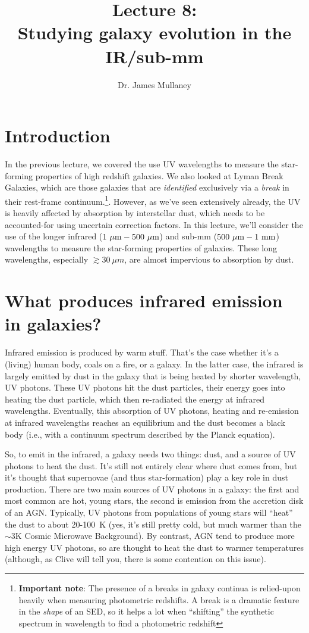 \documentclass[11pt]{article}
\begin{document}
 
\title{Lecture 8:\\Studying galaxy evolution in the IR/sub-mm}
\author{Dr. James Mullaney}
\maketitle

\section{Introduction}
In the previous lecture, we covered the use UV wavelengths to measure
the star-forming properties of high redshift galaxies. We also looked
at Lyman Break Galaxies, which are those galaxies that are {\it
  identified} exclusively via a {\it break} in their rest-frame
continuum.\footnote{{\bf Important note}: The presence of a breaks in
  galaxy continua is relied-upon heavily when measuring photometric
  redshifts. A break is a dramatic feature in the {\it shape} of an
  SED, so it helps a lot when ``shifting'' the synthetic spectrum in
  wavelength to find a photometric redshift}. However, as we've
seen extensively already, the UV is heavily affected by absorption
by interstellar dust, which needs to be accounted-for using uncertain
correction factors. In this lecture, we'll consider the use of the
longer infrared (${\rm 1~\rm \mu m - 500~\mu m}$) and sub-mm
(${\rm 500~\rm \mu m - 1~mm}$) wavelengths to measure the star-forming
properties of galaxies. These long wavelengths, especially
$\gtrsim30~\mu m$, are almost impervious to absorption by dust.

\section{What produces infrared emission in galaxies?}
Infrared emission is produced by warm stuff. That's the case whether
it's a (living) human body, coals on a fire, or a galaxy. In the
latter case, the infrared is largely emitted by dust in the galaxy
that is being heated by shorter wavelength, UV photons. These UV
photons hit the dust particles, their energy goes into heating the
dust particle, which then re-radiated the energy at infrared
wavelengths. Eventually, this absorption of UV photons, heating and
re-emission at infrared wavelengths reaches an equilibrium and the
dust becomes a black body (i.e., with a continuum spectrum described
by the Planck equation).

So, to emit in the infrared, a galaxy needs two things: dust, and a
source of UV photons to heat the dust. It's still not entirely clear
where dust comes from, but it's thought that supernovae (and thus
star-formation) play a key role in dust production. There are two main
sources of UV photons in a galaxy: the first and most common are hot,
young stars, the second is emission from the accretion disk of an
AGN. Typically, UV photons from populations of young stars will
``heat'' the dust to about 20-100~K (yes, it's still pretty cold, but
much warmer than the $\sim3$K Cosmic Microwave Background). By
contrast, AGN tend to produce more high energy UV photons, so are
thought to heat the dust to warmer temperatures (although, as Clive
will tell you, there is some contention on this issue).
\end{document}
